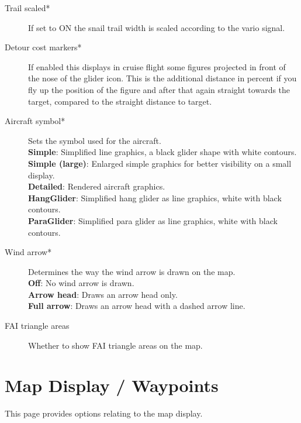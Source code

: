 \begin{description}
\item[Trail scaled*] \label{conf:trailscaled} If set to ON the snail trail 
  width is scaled according to the vario signal.
\item[Detour cost markers*]  If enabled this displays in cruise flight some
  figures projected in front of the nose of the glider icon.  This is the
  additional distance in percent if you fly up the position of the figure and
  after that again straight towards the target, compared to the straight distance
  to target.
\item[Aircraft symbol*]  Sets the symbol used for the aircraft. \\
  {\bf Simple}: Simplified line graphics, a black glider shape with white contours. \\
  {\bf Simple (large)}: Enlarged simple graphics for better visibility on a small display. \\
  {\bf Detailed}: Rendered aircraft graphics. \\
  {\bf HangGlider}: Simplified hang glider as line graphics, white with black contours. \\
  {\bf ParaGlider}: Simplified para glider as line graphics, white with black contours.
\item[Wind arrow*]  Determines the way the wind arrow is drawn on the map. \\
  {\bf Off}: No wind arrow is drawn. \\
  {\bf Arrow head}: Draws an arrow head only. \\
  {\bf Full arrow}: Draws an arrow head with a dashed arrow line.
\item[FAI triangle areas] Whether to show FAI triangle areas on the map.
  
\end{description}


\section{Map Display / Waypoints}\label{sec:waypoint-display}

This page provides options relating to the map display.

